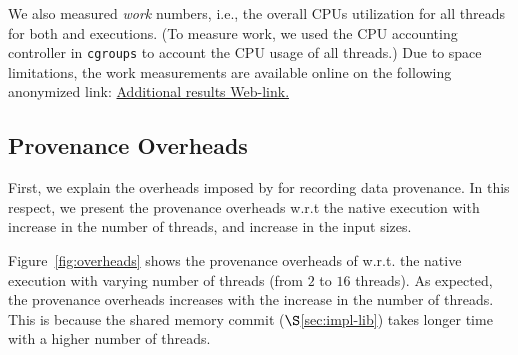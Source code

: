  We also measured  {\em work} numbers, i.e., the overall CPUs utilization for all threads for both \pthreads and \projecttitle executions. (To measure work, we used the CPU accounting controller in {\tt cgroups} to account the CPU usage of all threads.) Due to space limitations, the work measurements are available online on the following anonymized link:  \href{https://goo.gl/0wp1kC}{Additional results Web-link.}




\subsection{Provenance Overheads}
\label{subsec:overheads}
First, we explain the overheads imposed by \projecttitle for recording data provenance. In this respect, we present the provenance overheads w.r.t the native \pthreads execution with increase in the number of threads, and increase in the input sizes.


 Figure~\ref{fig:overheads} shows the provenance overheads of \projecttitle w.r.t. the native \pthreads execution with varying number of
threads (from $2$ to $16$ threads). As expected, the provenance overheads increases with the increase in the number of threads. This is because the shared memory commit ($\S$\ref{sec:impl-lib}) takes longer time with a higher number of threads. 

